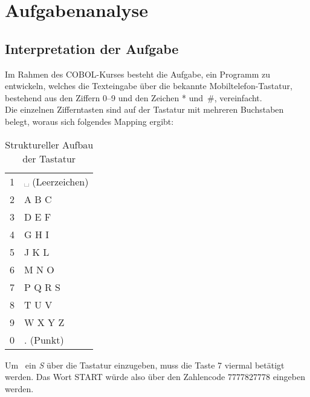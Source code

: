 \chapter{Aufgabenanalyse}\label{ch:aufgabenanalyse}


\section{Interpretation der Aufgabe}\label{sec:interpretation-der-aufgabe}
Im Rahmen des COBOL-Kurses besteht die Aufgabe, ein Programm zu entwickeln, welches die Texteingabe über die bekannte Mobiltelefon-Tastatur, bestehend aus den Ziffern 0--9 und den Zeichen * und~\#, vereinfacht.\\
\noindent
Die einzelnen Zifferntasten sind auf der Tastatur mit mehreren Buchstaben belegt, woraus sich folgendes Mapping ergibt:

\begin{table}[h]
    \centering
    \label{tab:tastatur-aufbau}
    \begin{tabular}{|ll|}
        \hline
        1 & ␣ (Leerzeichen) \\
        2 & A B C           \\
        3 & D E F           \\
        4 & G H I           \\
        5 & J K L           \\
        6 & M N O           \\
        7 & P Q R S         \\
        8 & T U V           \\
        9 & W X Y Z         \\
        0 & . (Punkt)       \\\hline
    \end{tabular}
    \caption{Struktureller Aufbau der Tastatur}
\end{table}
\noindent
Um \zB~ein \textit{S} über die Tastatur einzugeben, muss die Taste 7 viermal betätigt werden.
Das Wort START würde also über den Zahlencode 7777827778 eingeben werden.


